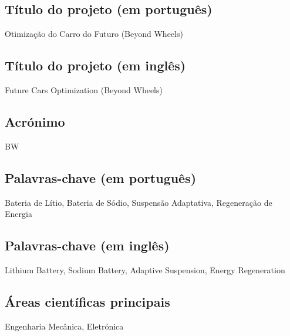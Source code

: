 
\subsection{Título do projeto (em português)}
\begin{campotexto}
Otimização do Carro do Futuro (Beyond Wheels)
\end{campotexto}

\subsection{Título do projeto (em inglês)}
\begin{campotexto}
Future Cars Optimization (Beyond Wheels)
\end{campotexto}

\subsection{Acrónimo}
\begin{campotexto}
BW
\end{campotexto}

\subsection{Palavras-chave (em português)}
\begin{campotexto}
Bateria de Lítio, Bateria de Sódio, Suspensão Adaptativa, Regeneração de Energia
\end{campotexto}

\subsection{Palavras-chave (em inglês)}
\begin{campotexto}
Lithium Battery, Sodium Battery, Adaptive Suspension, Energy Regeneration
\end{campotexto}

\subsection{Áreas científicas principais}
\begin{campotexto}
Engenharia Mecânica, Eletrónica
\end{campotexto}


